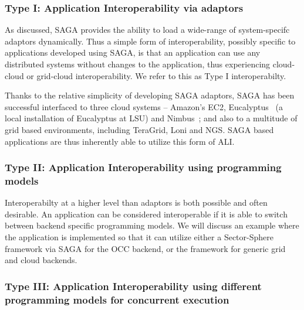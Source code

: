 \documentclass[3p,twocolumn]{elsarticle}
\begin{document}

\subsubsection{Type I: Application Interoperability via adaptors}
%
%

As discussed, SAGA provides the ability to load a wide-range of
system-specifc adaptors dynamically. Thus a simple form of
interoperability, possibly specific to applications developed using
SAGA, is that an application can use any distributed systems without
changes to the application, thus experiencing cloud-cloud or
grid-cloud interoperability.  We refer to this as Type I
interoperabilty.


Thanks to the relative simplicity of developing SAGA adaptors, SAGA
has been successful interfaced to three cloud systems -- Amazon's EC2,
Eucalyptus~\cite{eucalyptus} (a local installation of Eucalyptus at
LSU) and Nimbus~\cite{nimbus}; and also to a multitude of grid based
environments, including TeraGrid, Loni and NGS.  SAGA based
applications are thus inherently able to utilize this form of ALI.

\subsubsection{Type II: Application Interoperability using programming
  models} %
%
%

Interoperabilty at a higher level than adaptors is both possible and
often desirable. An application can be considered interoperable if it
is able to switch between backend specific programming models.  We
will discuss an example where the \wc application is implemented so
that it can utilize either a Sector-Sphere framework via SAGA for the
OCC backend, or the \smr framework for generic grid and cloud
backends.


\subsubsection{Type III: Application Interoperability using different
  programming models for concurrent execution}
%
%
\end{document}
